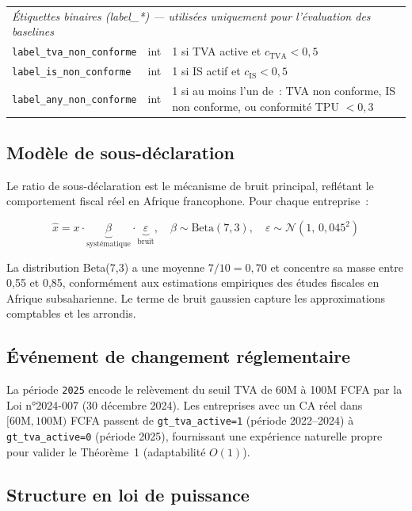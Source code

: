 \documentclass[letterpaper]{article}
\begin{document}
\begin{longtable}{lp{2.2cm}p{7.5cm}}
\multicolumn{3}{l}{\textit{\'Etiquettes binaires (label\_*) --- utilis\'ees uniquement pour l'\'evaluation des baselines}} \\[2pt]
\texttt{label\_tva\_non\_conforme} & int & 1 si TVA active et $c_{\text{TVA}} < 0{,}5$ \\
\texttt{label\_is\_non\_conforme} & int & 1 si IS actif et $c_{\text{IS}} < 0{,}5$ \\
\texttt{label\_any\_non\_conforme} & int & 1 si au moins l'un de~: TVA non conforme, IS non conforme, ou conformit\'e TPU $< 0{,}3$ \\

\end{longtable}

\subsection{Mod\`ele de sous-d\'eclaration}

Le ratio de sous-d\'eclaration est le m\'ecanisme de bruit principal,
refl\'etant le comportement fiscal r\'eel en Afrique francophone.
Pour chaque entreprise~:

\[
  \hat{x} = x \cdot \underbrace{\beta}_{\text{syst\'ematique}} \cdot
  \underbrace{\varepsilon}_{\text{bruit}}, \quad
  \beta \sim \text{Beta}(7, 3), \quad
  \varepsilon \sim \mathcal{N}(1,\, 0{,}045^2)
\]

La distribution Beta(7,3) a une moyenne $7/10 = 0{,}70$ et concentre
sa masse entre 0,55 et 0,85, conform\'ement aux estimations empiriques
des \'etudes fiscales en Afrique subsaharienne. Le terme de bruit
gaussien capture les approximations comptables et les arrondis.

\subsection{\'Ev\'enement de changement r\'eglementaire}

La p\'eriode \texttt{2025} encode le rel\`evement du seuil TVA de
60M \`a 100M FCFA par la Loi n°2024-007 (30 d\'ecembre 2024).
Les entreprises avec un CA r\'eel dans $[60\text{M}, 100\text{M})$
FCFA passent de \texttt{gt\_tva\_active=1} (p\'eriode 2022--2024)
\`a \texttt{gt\_tva\_active=0} (p\'eriode 2025), fournissant une
exp\'erience naturelle propre pour valider le Th\'eor\`eme~1
(adaptabilit\'e $O(1)$).

\subsection{Structure en loi de puissance}
\end{document}
